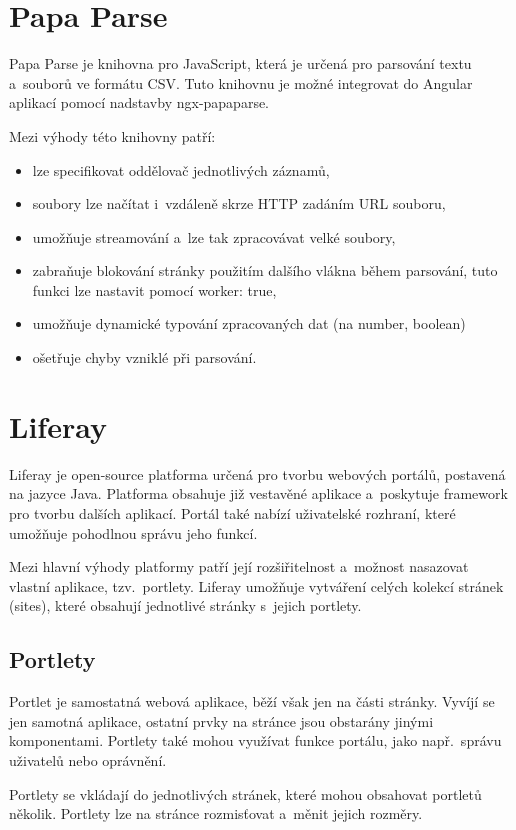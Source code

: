\documentclass[
  digital, %
  oneside, %
  table,   %
  nolof,     %
  nolot,     %
]{fithesis3}
\begin{document}
\section{Papa Parse}
Papa Parse je knihovna pro JavaScript, která je určená pro parsování textu a~souborů ve formátu CSV. Tuto knihovnu je možné integrovat do Angular aplikací pomocí nadstavby ngx-papaparse.\par
Mezi výhody této knihovny patří: \cite{papa}
\begin{itemize}
  \item lze specifikovat oddělovač jednotlivých záznamů,
  \item soubory lze načítat i~vzdáleně skrze HTTP zadáním URL souboru,
  \item umožňuje streamování a~lze tak zpracovávat velké soubory,
  \item zabraňuje blokování stránky použitím dalšího vlákna během parsování, tuto funkci lze nastavit pomocí worker: true,
  \item umožňuje dynamické typování zpracovaných dat (na number, boolean)
  \item ošetřuje chyby vzniklé při parsování.
\end{itemize}

\section{Liferay} \label{liferay}
Liferay je open-source platforma určená pro tvorbu webových portálů, postavená na jazyce Java. Platforma obsahuje již vestavěné aplikace a~poskytuje framework pro tvorbu dalších aplikací. Portál také nabízí uživatelské rozhraní, které umožňuje pohodlnou správu jeho funkcí.\par
Mezi hlavní výhody platformy patří její rozšiřitelnost a~možnost nasazovat vlastní aplikace, tzv.~portlety. Liferay umožňuje vytváření celých kolekcí stránek (sites), které obsahují jednotlivé stránky s~jejich portlety.\cite{liferay}
\subsection{Portlety}
Portlet je samostatná webová aplikace, běží však jen na části stránky. Vyvíjí se jen samotná aplikace, ostatní prvky na stránce jsou obstarány jinými komponentami. Portlety také mohou využívat funkce portálu, jako např.~správu uživatelů nebo oprávnění.\par
Portlety se vkládají do jednotlivých stránek, které mohou obsahovat portletů několik. Portlety lze na stránce rozmisťovat a~měnit jejich rozměry. \cite{liferay}
\end{document}
